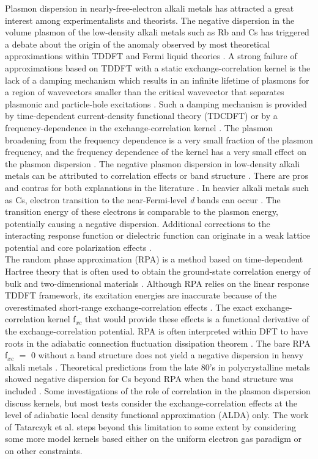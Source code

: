 \documentclass[aps,amsmath,amssymb, preprint, 12pt]{revtex4-1}
\begin{document}
Plasmon dispersion in nearly-free-electron alkali metals has attracted a great interest among experimentalists and theorists. The negative dispersion in the volume plasmon of the low-density alkali metals such as Rb and Cs has triggered a debate about the origin of the anomaly observed by most theoretical approximations within TDDFT and Fermi liquid theories \cite{VSF89}. A strong failure of approximations based on TDDFT with a static exchange-correlation kernel is the lack of a damping mechanism which results in an infinite lifetime of plasmons for a region of wavevectors smaller than the critical wavevector that separates plasmonic and particle-hole excitations \cite{VSF89, PN66}. {\color{red} Such a damping mechanism is provided by time-dependent current-density functional theory (TDCDFT) \cite{VK96,VUC97,UV02} or by a frequency-dependence in the exchange-correlation kernel \cite{VUC97, RNPP}. The plasmon broadening from the frequency dependence is a very small fraction of the plasmon frequency, and the frequency dependence of the kernel has a very small effect on the plasmon dispersion \cite{RNPP}}. The negative plasmon dispersion in low-density alkali metals can be attributed to
correlation effects or band structure \cite{AK94, KE99, T92, TS92}. There are pros and contras for both explanations in the literature \cite{T92, TS92}. In heavier alkali metals such as Cs, electron transition to the near-Fermi-level \textit{d} bands can occur \cite{AK94, KE99}. The transition energy of these electrons is comparable to the plasmon energy, potentially causing a negative dispersion. Additional corrections to the interacting response function or dielectric function can originate in a weak lattice potential and core polarization effects \cite{VSF89}.\\ 

The random phase approximation (RPA) is a {\color{red} method based on time-dependent Hartree theory} that is often used to obtain the ground-state correlation energy of bulk and two-dimensional materials \cite{BP53, NRB18, NABR19, SGK13, HSK10}. Although RPA relies on the linear response TDDFT framework, its excitation energies are inaccurate because of the overestimated short-range exchange-correlation effects \cite{LP75}. The exact exchange-correlation kernel f$_{xc}$ that would provide these effects is a functional derivative of the exchange-correlation potential. RPA is often interpreted within DFT to have roots in the adiabatic connection fluctuation dissipation theorem \cite{LP77}. The bare RPA f$_{xc}$ $=$ 0 without a band structure does not yield a negative dispersion in heavy alkali metals \cite{AK94}. Theoretical predictions from the late 80's in polycrystalline metals showed negative dispersion for Cs beyond RPA when the band structure was included \cite{VSF89}. Some investigations of the role of correlation in the plasmon dispersion discuss kernels, but most tests consider the exchange-correlation effects at the level of adiabatic local density functional approximation (ALDA) only. The work of Tatarczyk et al. \cite{TSS01} steps beyond this limitation to some extent by considering some more model kernels based either on the uniform electron gas paradigm or on other constraints.\\
\end{document}
